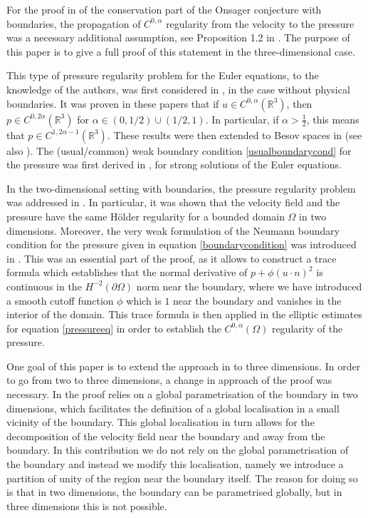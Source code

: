\documentclass[12pt,a4paper]{article}
\theoremstyle{definition}
\theoremstyle{remark}
\numberwithin{equation}{section}
\begin{document}
For the proof in \cite{titi2018} of the conservation part of the Onsager conjecture with boundaries, the propagation of $C^{0, \alpha}$ regularity from the velocity to the pressure was a necessary additional assumption, see Proposition 1.2 in \cite{titi2018}. The purpose of this paper is to give a full proof of this statement in the three-dimensional case.

This type of pressure regularity problem for the Euler equations, to the knowledge of the authors, was first considered in \cite{silvestre,constantinlocal}, in the case without physical boundaries. It was proven in these papers that if $u \in C^{0, \alpha} (\mathbb{R}^3)$, then $p \in C^{0, 2\alpha} (\mathbb{R}^3)$ for $\alpha \in (0,1/2) \cup (1/2,1)$. In particular, if $\alpha > \frac{1}{2}$, this means that $p \in C^{1,2\alpha-1} (\mathbb{R}^3)$. These results were then extended to Besov spaces in \cite{colombo} (see also \cite{colomboregularity}). The (usual/common) weak boundary condition \eqref{usualboundarycond} for the pressure was first derived in \cite{temameuler}, for strong solutions of the Euler equations. 

In the two-dimensional setting with boundaries, the pressure regularity problem was addressed in \cite{bardos2021}. In particular, it was shown that the velocity field and the pressure have the same H\"older regularity for a bounded domain $\Omega$ in two dimensions. Moreover, the very weak formulation of the Neumann boundary condition for the pressure given in equation \eqref{boundarycondition} was introduced in \cite{bardos2021}. This was an essential part of the proof, as it allows to construct a trace formula which establishes that the normal derivative of $p + \phi (u\cdot n)^2$ is continuous in the $H^{-2} (\partial \Omega)$ norm near the boundary, where we have introduced a smooth cutoff function $\phi$ which is $1$ near the boundary and vanishes in the interior of the domain. This trace formula is then applied in the elliptic estimates for equation \eqref{pressureeq} in order to establish the $C^{0,\alpha} (\Omega)$ regularity of the pressure.

One goal of this paper is to extend the approach in \cite{bardos2021} to three dimensions. In order to go from two to three dimensions, a change in approach of the proof was necessary. In \cite{bardos2021} the proof relies on a global parametrisation of the boundary in two dimensions, which facilitates the definition of a global localisation in a small vicinity of the boundary. This global localisation in turn allows for the decomposition of the velocity field near the boundary and away from the boundary. In this contribution we do not rely on the global parametrisation of the boundary and instead we modify this localisation, namely we introduce a partition of unity of the region near the boundary itself. The reason for doing so is that in two dimensions, the boundary can be parametrised globally, but in three dimensions this is not possible. 
\end{document}
